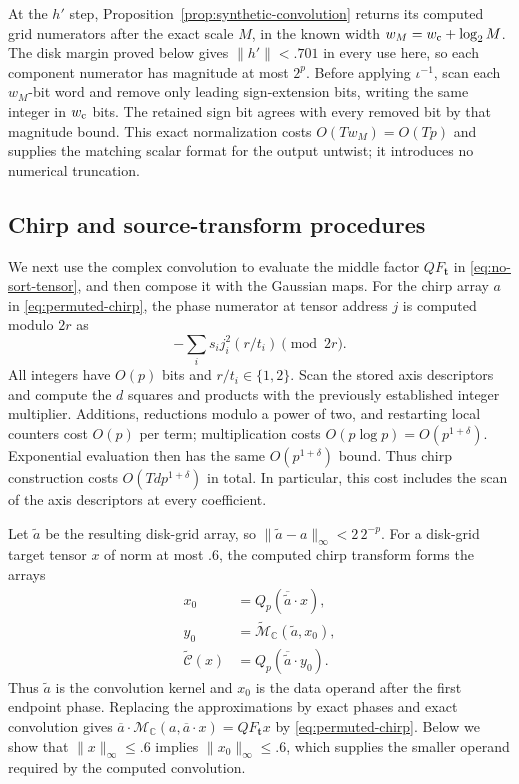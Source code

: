 \documentclass[11pt]{article}
\theoremstyle{definition}
\begin{document}
At the $h'$ step, Proposition~\ref{prop:synthetic-convolution} returns
its computed grid numerators after the exact scale $M$, in the known width
$w_M=w_{\rm c}+\log_2M$. The disk margin proved below gives
$\|h'\|<.701$ in every use here, so each component numerator has
magnitude at most $2^p$. Before applying $\iota^{-1}$, scan each
$w_M$-bit word and remove only leading sign-extension bits, writing the
same integer in $w_{\rm c}$ bits. The retained sign bit agrees with every
removed bit by that magnitude bound. This exact normalization costs
$O(Tw_M)=O(Tp)$ and supplies the matching scalar format for the output
untwist; it introduces no numerical truncation.

\subsection{Chirp and source-transform procedures}

We next use the complex convolution to evaluate the middle factor
$QF_{\boldsymbol t}$ in \eqref{eq:no-sort-tensor}, and then compose it
with the Gaussian maps. For the chirp array $a$ in
\eqref{eq:permuted-chirp}, the phase numerator
at tensor address $j$ is computed modulo $2r$ as
\[
 -\sum_i s_i j_i^2(r/t_i)\pmod{2r}.
\]
All integers have $O(p)$ bits and $r/t_i\in\{1,2\}$.  Scan the stored
axis descriptors and compute the $d$ squares and products with the
previously established integer multiplier.  Additions, reductions
modulo a power of two, and restarting local counters cost $O(p)$ per
term; multiplication costs $O(p\log p)=O(p^{1+\delta})$.  Exponential
evaluation then has the same $O(p^{1+\delta})$ bound.  Thus chirp
construction costs $O(Td p^{1+\delta})$ in total.  In particular, this
cost includes the scan of the axis descriptors at every coefficient.

Let $\widetilde a$ be the resulting disk-grid array, so
$\|\widetilde a-a\|_\infty<2\,2^{-p}$.  For a disk-grid target tensor
$x$ of norm at most $.6$, the computed chirp transform forms the arrays
\[
 \begin{aligned}
 x_0&=Q_p(\overline{\widetilde a}\mathbin{\cdot}x),\\
 y_0&=\widetilde{\mathcal M}_{\mathbb C}(\widetilde a,x_0),\\
 \widetilde{\mathscr C}(x)
     &=Q_p(\overline{\widetilde a}\mathbin{\cdot}y_0).
 \end{aligned}
\]
Thus $\widetilde a$ is the convolution kernel and $x_0$ is the data
operand after the first endpoint phase.  Replacing the approximations
by exact phases and exact convolution gives
$\overline a\mathbin{\cdot}\mathcal M_{\mathbb C}
(a,\overline a\mathbin{\cdot}x)=QF_{\boldsymbol t}x$ by
\eqref{eq:permuted-chirp}.  Below we show that $\|x\|_\infty\le.6$
implies $\|x_0\|_\infty\le.6$, which supplies the smaller operand
required by the computed convolution.
\end{document}
